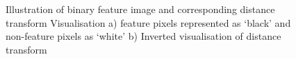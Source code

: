 \begin{figure}[!ht]

    \caption[Binary Feature Image and Distance Transform] {Illustration of binary feature image and corresponding distance transform Visualisation a) feature pixels represented as `black' and non-feature pixels as `white' b) Inverted visualisation of distance transform}
    \label{fig:distancetrf}
\end{figure}


